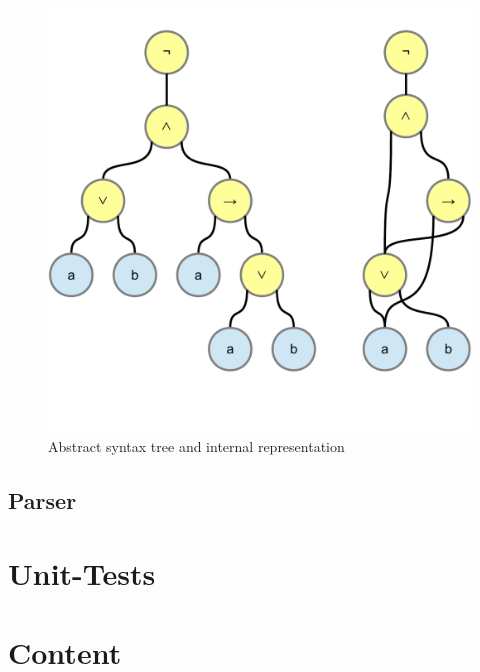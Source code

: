 \begin{figure}[htbp]
\begin{center}
\includegraphics[scale=0.5]{diagrams/AcyclicSyntaxGraph.pdf}
\caption{Abstract syntax tree and internal representation}
\label{fig:NyayaNodeDisplay}
\end{center}
\end{figure}




\subsection{Parser}
\cite{Louden:1997:CCP:523017}

\section{Unit-Tests}

\section{Content}



